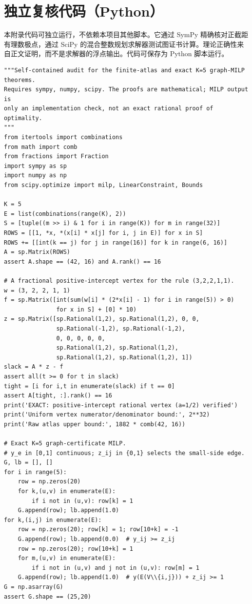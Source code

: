 \documentclass[11pt,a4paper]{ctexart}
\theoremstyle{definition}
\begin{document}
\section{独立复核代码（Python）}
本附录代码可独立运行，不依赖本项目其他脚本。它通过 SymPy 精确核对正截距有理数极点，通过 SciPy 的混合整数规划求解器测试图证书计算。理论正确性来自正文证明，而不是求解器的浮点输出。代码可保存为 Python 脚本运行。
\begin{lstlisting}[caption={Finite certificate vertex and graph MILP audit}]
"""Self-contained audit for the finite-atlas and exact K=5 graph-MILP theorems.
Requires sympy, numpy, scipy. The proofs are mathematical; MILP output is
only an implementation check, not an exact rational proof of optimality.
"""
from itertools import combinations
from math import comb
from fractions import Fraction
import sympy as sp
import numpy as np
from scipy.optimize import milp, LinearConstraint, Bounds

K = 5
E = list(combinations(range(K), 2))
S = [tuple((m >> i) & 1 for i in range(K)) for m in range(32)]
ROWS = [[1, *x, *(x[i] * x[j] for i, j in E)] for x in S]
ROWS += [[int(k == j) for j in range(16)] for k in range(6, 16)]
A = sp.Matrix(ROWS)
assert A.shape == (42, 16) and A.rank() == 16

# A fractional positive-intercept vertex for the rule (3,2,2,1,1).
w = (3, 2, 2, 1, 1)
f = sp.Matrix([int(sum(w[i] * (2*x[i] - 1) for i in range(5)) > 0)
               for x in S] + [0] * 10)
z = sp.Matrix([sp.Rational(1,2), sp.Rational(1,2), 0, 0,
               sp.Rational(-1,2), sp.Rational(-1,2),
               0, 0, 0, 0, 0,
               sp.Rational(1,2), sp.Rational(1,2),
               sp.Rational(1,2), sp.Rational(1,2), 1])
slack = A * z - f
assert all(t >= 0 for t in slack)
tight = [i for i,t in enumerate(slack) if t == 0]
assert A[tight, :].rank() == 16
print('EXACT: positive-intercept rational vertex (a=1/2) verified')
print('Uniform vertex numerator/denominator bound:', 2**32)
print('Raw atlas upper bound:', 1882 * comb(42, 16))

# Exact K=5 graph-certificate MILP.
# y_e in [0,1] continuous; z_ij in {0,1} selects the small-side edge.
G, lb = [], []
for i in range(5):
    row = np.zeros(20)
    for k,(u,v) in enumerate(E):
        if i not in (u,v): row[k] = 1
    G.append(row); lb.append(1.0)
for k,(i,j) in enumerate(E):
    row = np.zeros(20); row[k] = 1; row[10+k] = -1
    G.append(row); lb.append(0.0)  # y_ij >= z_ij
    row = np.zeros(20); row[10+k] = 1
    for m,(u,v) in enumerate(E):
        if i not in (u,v) and j not in (u,v): row[m] = 1
    G.append(row); lb.append(1.0)  # y(E(V\\{i,j})) + z_ij >= 1
G = np.asarray(G)
assert G.shape == (25,20)


\end{lstlisting}
\end{document}
